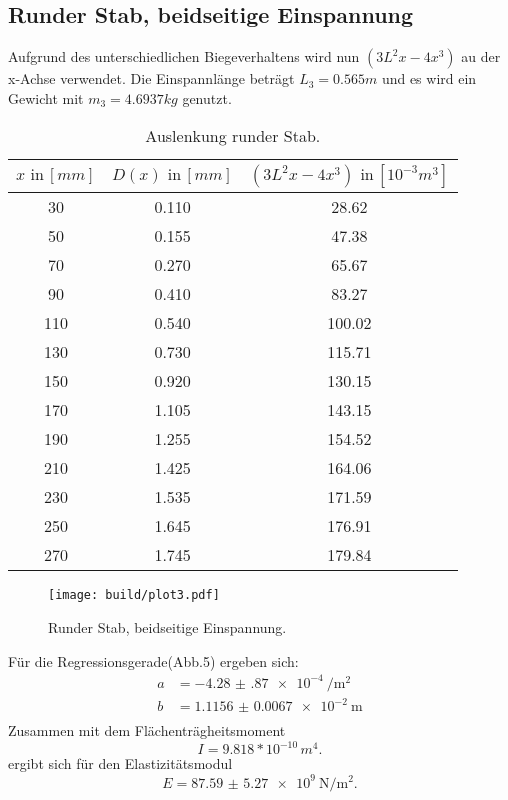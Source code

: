\subsection{Runder Stab, beidseitige Einspannung}
Aufgrund des unterschiedlichen Biegeverhaltens wird nun $(3L^2x-4x^3)$
au der x-Achse verwendet. Die Einspannlänge beträgt $L_3 = 0.565m$
und es wird ein Gewicht mit $m_3 = 4.6937 kg$ genutzt.

\begin{table}[h]
  \centering
  \label{tab:lit3}
  \begin{tabular}{ c c c }
    \toprule
    $x \,\, \text{in} \, [mm]$
   &{$D(x) \,\, \text{in} \, [mm]$}
   &{$(3L^2x-4x^3)\,\, \text{in} \, [10^{-3}m^3]$} \\

    \midrule
    30  & 0.110 & 28.62\\
    50  & 0.155 & 47.38\\
    70  & 0.270 & 65.67\\
    90  & 0.410 & 83.27\\
    110 & 0.540 & 100.02\\
    130 & 0.730 & 115.71\\
    150 & 0.920 & 130.15\\
    170 & 1.105 & 143.15\\
    190 & 1.255 & 154.52\\
    210 & 1.425 & 164.06\\
    230 & 1.535 & 171.59\\
    250 & 1.645 & 176.91\\
    270 & 1.745 & 179.84\\

    \bottomrule
  \end{tabular}
  \caption{Auslenkung runder Stab.}
\end{table}

\begin{figure}
  \centering
  \texttt{[image: build/plot3.pdf]}
  \caption{Runder Stab, beidseitige Einspannung.}
  \label{fig:plot3}
\end{figure}
Für die Regressionsgerade(Abb.5) ergeben sich:
\begin{align*}
  a &= \SI{-4.28(87)e-4}{\per\square\meter} \\
  b &= \SI{1.1156(67)e-2}{\meter} \\
\end{align*}
Zusammen mit dem Flächenträgheitsmoment
\begin{equation*}
  I = 9.818*10^{-10}\, m^4.
\end{equation*}
ergibt sich für den Elastizitätsmodul
\begin{equation*}
  E = \SI{87.59(527)e9}{\newton\per\square\meter} .
\end{equation*}
\newpage
